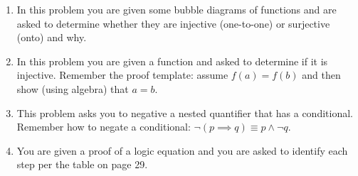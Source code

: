 \documentclass[letterpaper,12pt,fleqn]{article}
\begin{document}
\begin{enumerate}[left=0in]
\item In this problem you are given some bubble diagrams of functions and are asked to determine whether they are
  injective (one-to-one) or surjective (onto) and why.

\item In this problem you are given a function and asked to determine if it is injective.  Remember the proof
  template: assume \(f(a)=f(b)\) and then show (using algebra) that \(a=b\).

\item This problem asks you to negative a nested quantifier that has a conditional.  Remember how to negate
  a conditional: \(\lnot(p\implies q)\equiv p\land\lnot q\).

\item You are given a proof of a logic equation and you are asked to identify each step per the table on
  page 29.
\end{enumerate}
\end{document}

